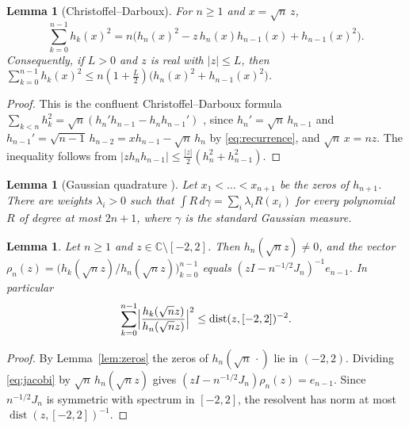 \documentclass[11pt]{amsart}
\newtheorem{lemma}[theorem]{Lemma}
\theoremstyle{definition}
\theoremstyle{remark}
\numberwithin{equation}{section}
\newcommand{\C}{\mathbb{C}}
\DeclareMathOperator{\dist}{dist}
\begin{document}
\begin{lemma}[Christoffel--Darboux]\label{lem:cd}
For $n\ge1$ and $x=\sqrt n\,z$,
\[
\sum_{k=0}^{n-1}h_k(x)^2=n\bigl(h_n(x)^2-z\,h_n(x)h_{n-1}(x)+h_{n-1}(x)^2\bigr).
\]
Consequently, if $L>0$ and $z$ is real with $|z|\le L$, then $\sum_{k=0}^{n-1}h_k(x)^2\le n(1+\tfrac L2)\bigl(h_n(x)^2+h_{n-1}(x)^2\bigr)$.
\end{lemma}

\begin{proof}
This is the confluent Christoffel--Darboux formula $\sum_{k<n}h_k^2=\sqrt n(h_n'h_{n-1}-h_nh_{n-1}')$ \cite[Section~3.2, (3.2.4)]{Sz}, since $h_n'=\sqrt n\,h_{n-1}$ and $h_{n-1}'=\sqrt{n-1}\,h_{n-2}=xh_{n-1}-\sqrt n\,h_n$ by \eqref{eq:recurrence}, and $\sqrt n\,x=nz$.
The inequality follows from $|zh_nh_{n-1}|\le\frac{|z|}2(h_n^2+h_{n-1}^2)$.
\end{proof}

\begin{lemma}[Gaussian quadrature {\cite[Theorems~3.4.1--3.4.2]{Sz}}]\label{lem:quadrature}
Let $x_1<\dots<x_{n+1}$ be the zeros of $h_{n+1}$. There are weights $\lambda_i>0$ such that $\int R\,d\gamma=\sum_i\lambda_iR(x_i)$ for every polynomial $R$ of degree at most $2n+1$, where $\gamma$ is the standard Gaussian measure.
\end{lemma}

\begin{lemma}\label{lem:resolvent}
Let $n\ge1$ and $z\in\C\setminus[-2,2]$. Then $h_n(\sqrt n z)\neq0$, and the vector $\rho_n(z)=\bigl(h_k(\sqrt nz)/h_n(\sqrt nz)\bigr)_{k=0}^{n-1}$ equals $(zI-n^{-1/2}J_n)^{-1}e_{n-1}$. In particular
\[
\sum_{k=0}^{n-1}\Bigl|\frac{h_k(\sqrt nz)}{h_n(\sqrt nz)}\Bigr|^2\le\dist(z,[-2,2])^{-2}.
\]
\end{lemma}

\begin{proof}
By Lemma~\ref{lem:zeros} the zeros of $h_n(\sqrt n\,\cdot)$ lie in $(-2,2)$. Dividing \eqref{eq:jacobi} by $\sqrt n\,h_n(\sqrt nz)$ gives $(zI-n^{-1/2}J_n)\rho_n(z)=e_{n-1}$. Since $n^{-1/2}J_n$ is symmetric with spectrum in $[-2,2]$, the resolvent has norm at most $\dist(z,[-2,2])^{-1}$.
\end{proof}
\end{document}
